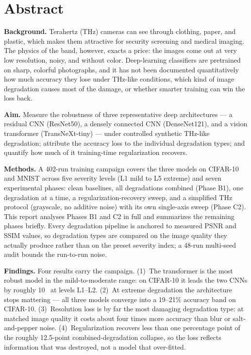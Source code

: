 \section*{Abstract}

\noindent\textbf{Background.}\quad
Terahertz (THz) cameras can see through clothing, paper, and plastic, which
makes them attractive for security screening and medical imaging. The physics
of the band, however, exacts a price: the images come out at very low
resolution, noisy, and without color. Deep-learning classifiers are pretrained
on sharp, colorful photographs, and it has not been documented quantitatively
how much accuracy they lose under THz-like conditions, which kind of image
degradation causes most of the damage, or whether smarter training can win the
loss back.

\noindent\textbf{Aim.}\quad
Measure the robustness of three representative deep architectures --- a
residual CNN (ResNet50), a densely connected CNN (DenseNet121), and a vision
transformer (TransNeXt-tiny) --- under controlled synthetic THz-like
degradation; attribute the accuracy loss to the individual degradation types;
and quantify how much of it training-time regularization recovers.

\noindent\textbf{Methods.}\quad
A 402-run training campaign covers the three models on CIFAR-10 and MNIST
across five severity levels (L1 mild to L5 extreme) and seven experimental
phases: clean baselines, all degradations combined (Phase B1), one degradation
at a time, a regularization-recovery sweep, and a simplified THz protocol
(grayscale, no additive noise) with its own single-axis sweep (Phase C2).
This report analyses Phases B1 and C2 in full and summarizes the remaining
phases briefly. Every degradation pipeline is anchored to measured PSNR and
SSIM values, so degradation types are compared on the image quality they
actually produce rather than on the preset severity index; a 48-run
multi-seed audit bounds the run-to-run noise.

\noindent\textbf{Findings.}\quad
Four results carry the campaign. (1)~The transformer is the most robust model
in the mild-to-moderate range: on CIFAR-10 it leads the two CNNs by roughly
10~\Mpp{} at levels L1--L2. (2)~At extreme degradation the architecture stops
mattering --- all three models converge into a 19--21\% accuracy band on
CIFAR-10. (3)~Resolution loss is by far the most damaging degradation type:
at matched image quality it costs about four times more accuracy than blur or
salt-and-pepper noise. (4)~Regularization recovers less than one percentage
point of the roughly 12.5-point combined-degradation collapse, so the loss
reflects information that was destroyed, not a model that over-fitted.

